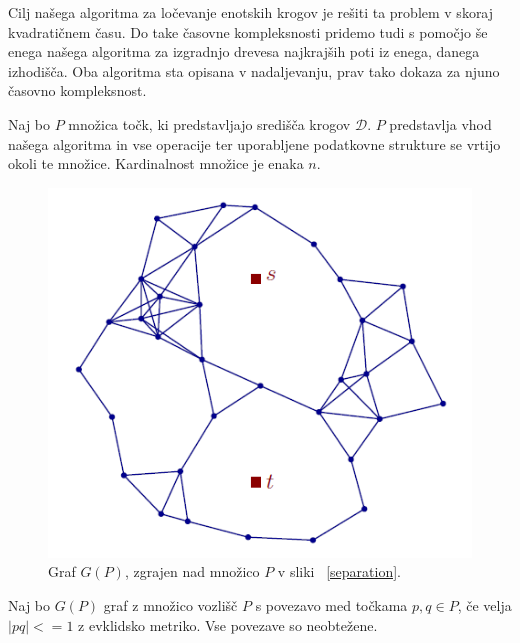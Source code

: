\documentclass[a4paper, 12pt]{book}
\newcommand{\D}{\ensuremath{\mathcal{D}}}
\begin{document}
Cilj našega algoritma za ločevanje enotskih krogov je rešiti ta problem v skoraj kvadratičnem času. Do take časovne kompleksnosti pridemo tudi s pomočjo še enega našega algoritma za izgradnjo drevesa najkrajših poti iz enega, danega izhodišča. Oba algoritma sta opisana v nadaljevanju, prav tako dokaza za njuno časovno kompleksnost.

Naj bo $P$ množica točk, ki predstavljajo središča krogov $\D$. $P$ predstavlja vhod našega algoritma in vse operacije ter uporabljene podatkovne strukture se vrtijo okoli te množice. Kardinalnost množice je enaka $n$.

\begin{figure}
\centerline{\includegraphics[scale=0.6]{pics/g-disks2.png}}
\caption{Graf $G(P)$, zgrajen nad množico $P$ v sliki ~\ref{separation}.}
\label{gdisks}
\end{figure}

Naj bo $G(P)$ graf z množico vozlišč $P$ s povezavo med točkama $p,q \in P$, če velja $|pq| <= 1$ z evklidsko metriko. Vse povezave so neobtežene.
\end{document}
